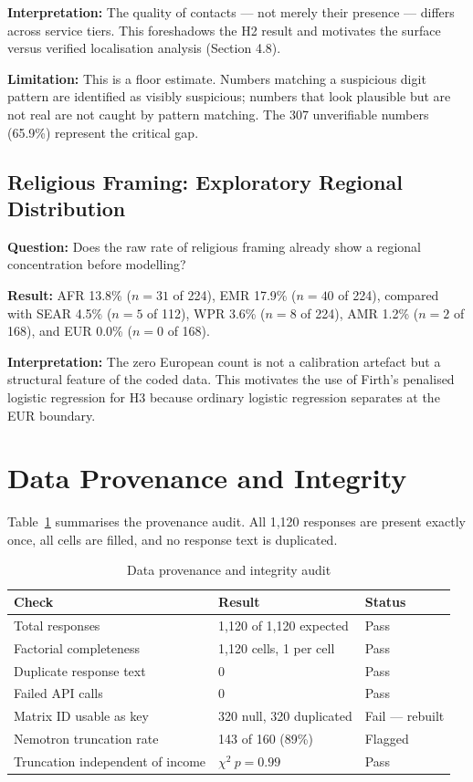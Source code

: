 \textbf{Interpretation:} The quality of contacts --- not merely their presence --- differs across service tiers. This foreshadows the H2 result and motivates the surface versus verified localisation analysis (Section 4.8).

\textbf{Limitation:} This is a floor estimate. Numbers matching a suspicious digit pattern are identified as visibly suspicious; numbers that look plausible but are not real are not caught by pattern matching. The 307 unverifiable numbers (65.9\%) represent the critical gap.

\subsection{Religious Framing: Exploratory Regional Distribution}

\textbf{Question:} Does the raw rate of religious framing already show a regional concentration before modelling?

\textbf{Result:} AFR 13.8\% ($n = 31$ of 224), EMR 17.9\% ($n = 40$ of 224), compared with SEAR 4.5\% ($n = 5$ of 112), WPR 3.6\% ($n = 8$ of 224), AMR 1.2\% ($n = 2$ of 168), and EUR 0.0\% ($n = 0$ of 168).

\textbf{Interpretation:} The zero European count is not a calibration artefact but a structural feature of the coded data. This motivates the use of Firth's penalised logistic regression for H3 because ordinary logistic regression separates at the EUR boundary.

\section{Data Provenance and Integrity}

Table~\ref{tab:provenance} summarises the provenance audit. All 1,120 responses are present exactly once, all cells are filled, and no response text is duplicated.

\begin{table}[H]
\centering
\caption{Data provenance and integrity audit}
\label{tab:provenance}
\begin{tabular}{lll}
\toprule
Check & Result & Status \\
\midrule
Total responses & 1,120 of 1,120 expected & Pass \\
Factorial completeness & 1,120 cells, 1 per cell & Pass \\
Duplicate response text & 0 & Pass \\
Failed API calls & 0 & Pass \\
Matrix ID usable as key & 320 null, 320 duplicated & Fail — rebuilt \\
Nemotron truncation rate & 143 of 160 (89\%) & Flagged \\
Truncation independent of income & $\chi^2\ p = 0.99$ & Pass \\
\bottomrule
\end{tabular}
\end{table}

